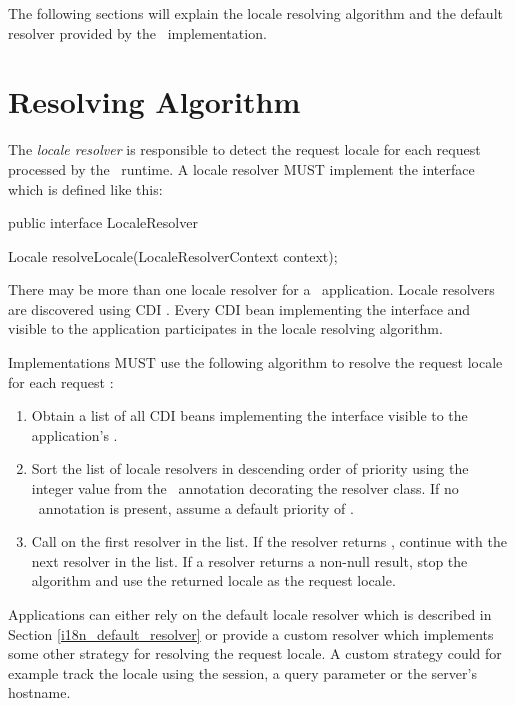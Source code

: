 The following sections will explain the locale resolving algorithm and the default
resolver provided by the \mvc\ implementation.

\section{Resolving Algorithm}
\label{i18n_resolving_algorithm}

The {\em locale resolver} is responsible to detect the request locale for each request
processed by the \mvc\ runtime. A locale resolver MUST implement the
 interface which is defined like this:

\begin{listing}{1}
public interface LocaleResolver {

    Locale resolveLocale(LocaleResolverContext context);

}
\end{listing}

There may be more than one locale resolver for a \mvc\ application. Locale resolvers
are discovered using CDI . Every CDI bean
implementing the  interface and visible to the application 
participates in the locale resolving algorithm.

Implementations MUST use the following algorithm to resolve the request locale for
each request :

\begin{enumerate}
\item Obtain a list of all CDI beans implementing the  interface
 visible to the application's .
\item Sort the list of locale resolvers in descending order of priority using the
 integer value from the \Priority\ annotation decorating the resolver class. If no
 \Priority\ annotation is present, assume a default priority of .
\item Call  on the first resolver in the list. If the resolver
 returns , continue with the next resolver in the list. If a resolver 
 returns a non-null result, stop the algorithm and use the returned locale as the request 
 locale. 
\end{enumerate}

Applications can either rely on the default locale resolver which is described
in Section \ref{i18n_default_resolver} or provide a custom resolver which implements
some other strategy for resolving the request locale. A custom strategy could for
example track the locale using the session, a query parameter or the server's
hostname.

